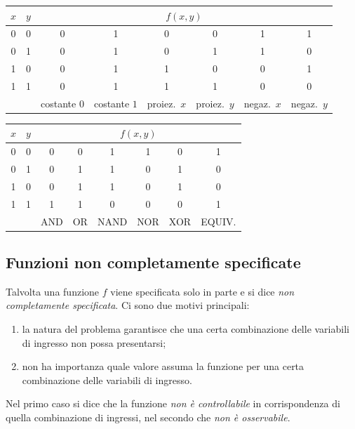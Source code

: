 \documentclass[11pt,a4paper]{article}
\begin{document}
\begin{esempio}
\begin{center}
\small
\begin{tabular}{cc|cccccc}
$x$ & $y$ & \multicolumn{6}{c}{$f(x,y)$} \\ \midrule
0 & 0 & 0 & 1 & 0 & 0 & 1 & 1 \\
0 & 1 & 0 & 1 & 0 & 1 & 1 & 0 \\
1 & 0 & 0 & 1 & 1 & 0 & 0 & 1 \\
1 & 1 & 0 & 1 & 1 & 1 & 0 & 0 \\ \midrule
\multicolumn{2}{c|}{}
  & \footnotesize costante $0$ & \footnotesize costante $1$
  & \footnotesize proiez.\ $x$ & \footnotesize proiez.\ $y$
  & \footnotesize negaz.\ $x$ & \footnotesize negaz.\ $y$
\end{tabular}
\end{center}
\end{esempio}

\begin{esempio}
\begin{center}
\small
\begin{tabular}{cc|cccccc}
$x$ & $y$ & \multicolumn{6}{c}{$f(x,y)$} \\ \midrule
0 & 0 & 0 & 0 & 1 & 1 & 0 & 1 \\
0 & 1 & 0 & 1 & 1 & 0 & 1 & 0 \\
1 & 0 & 0 & 1 & 1 & 0 & 1 & 0 \\
1 & 1 & 1 & 1 & 0 & 0 & 0 & 1 \\ \midrule
\multicolumn{2}{c|}{}
  & \footnotesize AND & \footnotesize OR & \footnotesize NAND
  & \footnotesize NOR & \footnotesize XOR & \footnotesize EQUIV.
\end{tabular}
\end{center}
\end{esempio}

\subsection{Funzioni non completamente specificate}

Talvolta una funzione $f$ viene specificata solo in parte e si dice
\emph{non completamente specificata}. Ci sono due motivi principali:
\begin{enumerate}
    \item la natura del problema garantisce che una certa combinazione delle
          variabili di ingresso non possa presentarsi;
    \item non ha importanza quale valore assuma la funzione per una certa
          combinazione delle variabili di ingresso.
\end{enumerate}
Nel primo caso si dice che la funzione \emph{non è controllabile} in
corrispondenza di quella combinazione di ingressi, nel secondo che
\emph{non è osservabile}.
\end{document}
